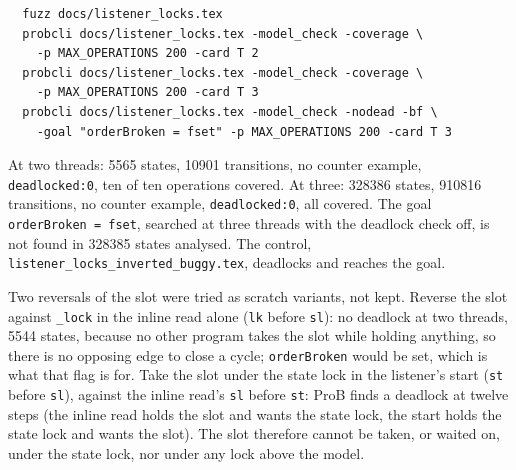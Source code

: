 \documentclass[a4paper,10pt,fleqn]{article}
\begin{document}
\begin{verbatim}
  fuzz docs/listener_locks.tex
  probcli docs/listener_locks.tex -model_check -coverage \
    -p MAX_OPERATIONS 200 -card T 2
  probcli docs/listener_locks.tex -model_check -coverage \
    -p MAX_OPERATIONS 200 -card T 3
  probcli docs/listener_locks.tex -model_check -nodead -bf \
    -goal "orderBroken = fset" -p MAX_OPERATIONS 200 -card T 3
\end{verbatim}

At two threads: 5565 states, 10901 transitions, no counter example,
\texttt{deadlocked:0}, ten of ten operations covered.  At three: 328386
states, 910816 transitions, no counter example, \texttt{deadlocked:0}, all
covered.  The goal \texttt{orderBroken = fset}, searched at three threads with
the deadlock check off, is not found in 328385 states analysed.  The control,
\texttt{listener\_locks\_inverted\_buggy.tex}, deadlocks and reaches the goal.

Two reversals of the slot were tried as scratch variants, not kept.  Reverse
the slot against \texttt{\_lock} in the inline read alone (\texttt{lk} before
\texttt{sl}): no deadlock at two threads, 5544 states, because no other program
takes the slot while holding anything, so there is no opposing edge to close a
cycle; \texttt{orderBroken} would be set, which is what that flag is for.  Take
the slot under the state lock in the listener's start (\texttt{st} before
\texttt{sl}), against the inline read's \texttt{sl} before \texttt{st}: ProB
finds a deadlock at twelve steps (the inline read holds the slot and wants the
state lock, the start holds the state lock and wants the slot).  The slot
therefore cannot be taken, or waited on, under the state lock, nor under any
lock above the model.
\end{document}
